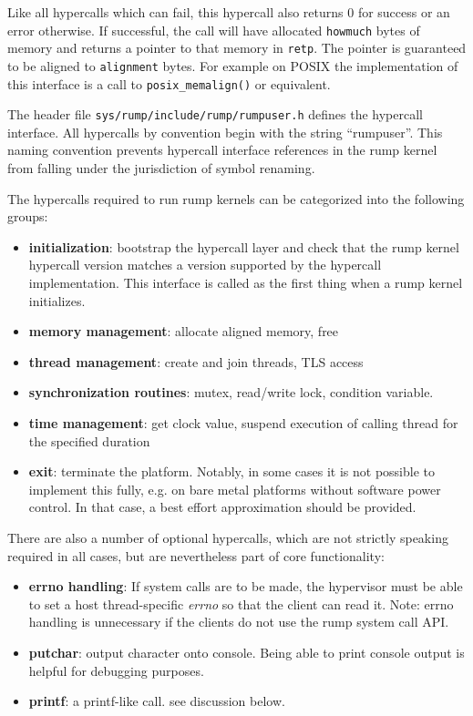 Like all hypercalls which can fail, this hypercall also returns 0
for success or an error otherwise.  If successful, the call will have
allocated \texttt{howmuch} bytes of memory and returns a pointer to that
memory in \texttt{retp}.  The pointer is guaranteed to be aligned to
\texttt{alignment} bytes.  For example on POSIX the implementation of
this interface is a call to \verb+posix_memalign()+ or equivalent.

The header file \texttt{sys/rump/include/rump/rumpuser.h} defines the
hypercall interface.  All hypercalls by convention begin with the string
``rumpuser''.  This naming convention prevents hypercall interface
references in the rump kernel from falling under the jurisdiction of
symbol renaming.

The hypercalls required to run rump kernels can be categorized into the
following groups:

\begin{itemize}
\item	\textbf{initialization}: bootstrap the hypercall layer and check
	that the rump kernel hypercall version matches a version
	supported by the hypercall implementation.  This interface is
	called as the first thing when a rump kernel initializes.
\item   \textbf{memory management}: allocate aligned memory, free
\item	\textbf{thread management}: create and join threads, TLS access
\item   \textbf{synchronization routines}: mutex, read/write lock,
	condition variable.
\item	\textbf{time management}: get clock value, suspend execution of
	calling thread for the specified duration
\item	\textbf{exit}: terminate the platform.  Notably, in some
	cases it is not possible to implement this fully, e.g. on
	bare metal platforms without software power control.  In that
	case, a best effort approximation should be provided.
\end{itemize}

There are also a number of optional hypercalls, which are not strictly
speaking required in all cases, but are nevertheless part of core
functionality:

\begin{itemize}
\item   \textbf{errno handling}: If system calls are to be made,
	the hypervisor must be able to set a host thread-specific
	\textit{errno} so that the client can read it.
	Note: errno handling is unnecessary if
	the clients do not use the rump system call API.
\item   \textbf{putchar}: output character onto console.  Being
	able to print console output is helpful for debugging purposes.
\item	\textbf{printf}: a printf-like call.  see discussion below.
\end{itemize}

